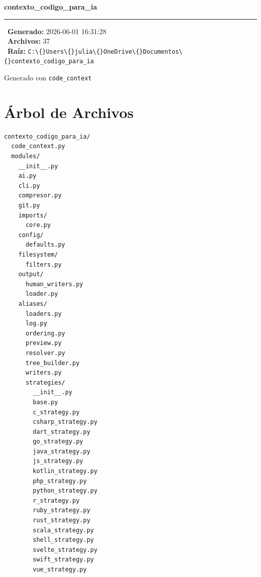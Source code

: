 \documentclass[12pt, a4paper]{report}
\begin{document}
\begin{titlepage}
  \pagecolor{primary}
  \color{white}
  \centering
  \vspace*{3cm}

  {\fontsize{72}{72}\selectfont\textcolor{accent}{}}

  \vspace{1.5cm}

  {\fontsize{36}{40}\selectfont\bfseries contexto\_codigo\_para\_ia}

  \vspace{0.5cm}
  \textcolor{accent}{\rule{8cm}{1.5pt}}
  \vspace{0.5cm}

  \begin{tcolorbox}[
    enhanced,
    colback=white!10,
    colframe=white!30,
    arc=4pt,
    boxrule=0.5pt,
    width=10cm,
    halign=center,
  ]
    \small
    \ \textbf{Generado:} 2026-06-01 16:31:28 \\[4pt]
    \ \textbf{Archivos:} 37 \\[4pt]
    \ \textbf{Raíz:} \texttt{C:\textbackslash\{\}Users\textbackslash\{\}julia\textbackslash\{\}OneDrive\textbackslash\{\}Documentos\textbackslash\{\}contexto\_codigo\_para\_ia}
  \end{tcolorbox}

  \vfill
  \textcolor{white!60}{\small Generado con \texttt{code\_context}}
\end{titlepage}
\nopagecolor

\tableofcontents
\clearpage

\chapter{Árbol de Archivos}

\begin{terminalbox}
\begin{Verbatim}[fontsize=\small, commandchars=\\\{\}]
contexto_codigo_para_ia/
  code_context.py
  modules/
    __init__.py
    ai.py
    cli.py
    compresor.py
    git.py
    imports/
      core.py
    config/
      defaults.py
    filesystem/
      filters.py
    output/
      human_writers.py
      loader.py
    aliases/
      loaders.py
      log.py
      ordering.py
      preview.py
      resolver.py
      tree_builder.py
      writers.py
      strategies/
        __init__.py
        base.py
        c_strategy.py
        csharp_strategy.py
        dart_strategy.py
        go_strategy.py
        java_strategy.py
        js_strategy.py
        kotlin_strategy.py
        php_strategy.py
        python_strategy.py
        r_strategy.py
        ruby_strategy.py
        rust_strategy.py
        scala_strategy.py
        shell_strategy.py
        svelte_strategy.py
        swift_strategy.py
        vue_strategy.py
\end{Verbatim}
\end{terminalbox}
\end{document}
